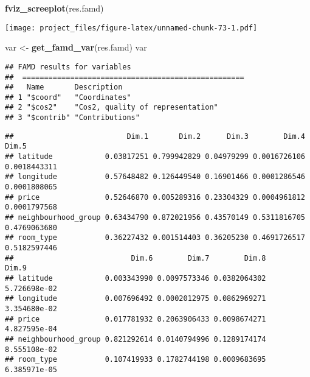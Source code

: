 \documentclass[
]{article}
\newenvironment{Shaded}{\begin{snugshade}}{\end{snugshade}}
\newcommand{\CommentTok}[1]{\textcolor[rgb]{0.56,0.35,0.01}{\textit{#1}}}
\newcommand{\KeywordTok}[1]{\textcolor[rgb]{0.13,0.29,0.53}{\textbf{#1}}}
\newcommand{\NormalTok}[1]{#1}
\newcommand{\OperatorTok}[1]{\textcolor[rgb]{0.81,0.36,0.00}{\textbf{#1}}}
\newcommand{\StringTok}[1]{\textcolor[rgb]{0.31,0.60,0.02}{#1}}
\begin{document}
\begin{Shaded}
\begin{Highlighting}[]
\KeywordTok{fviz_screeplot}\NormalTok{(res.famd)}
\end{Highlighting}
\end{Shaded}

\texttt{[image: project\_files/figure-latex/unnamed-chunk-73-1.pdf]}

\begin{Shaded}
\begin{Highlighting}[]
\NormalTok{var <-}\StringTok{ }\KeywordTok{get_famd_var}\NormalTok{(res.famd)}
\NormalTok{var}
\end{Highlighting}
\end{Shaded}

\begin{verbatim}
## FAMD results for variables 
##  ===================================================
##   Name       Description                      
## 1 "$coord"   "Coordinates"                    
## 2 "$cos2"    "Cos2, quality of representation"
## 3 "$contrib" "Contributions"
\end{verbatim}

\begin{Shaded}
\end{Shaded}

\begin{verbatim}
##                          Dim.1       Dim.2      Dim.3        Dim.4        Dim.5
## latitude            0.03817251 0.799942829 0.04979299 0.0016726106 0.0018443311
## longitude           0.57648482 0.126449540 0.16901466 0.0001286546 0.0001808065
## price               0.52646870 0.005289316 0.23304329 0.0004961812 0.0001797568
## neighbourhood_group 0.63434790 0.872021956 0.43570149 0.5311816705 0.4769063680
## room_type           0.36227432 0.001514403 0.36205230 0.4691726517 0.5182597446
##                           Dim.6        Dim.7        Dim.8        Dim.9
## latitude            0.003343990 0.0097573346 0.0382064302 5.726698e-02
## longitude           0.007696492 0.0002012975 0.0862969271 3.354680e-02
## price               0.017781932 0.2063906433 0.0098674271 4.827595e-04
## neighbourhood_group 0.821292614 0.0140794996 0.1289174174 8.555108e-02
## room_type           0.107419933 0.1782744198 0.0009683695 6.385971e-05
\end{verbatim}
\end{document}
